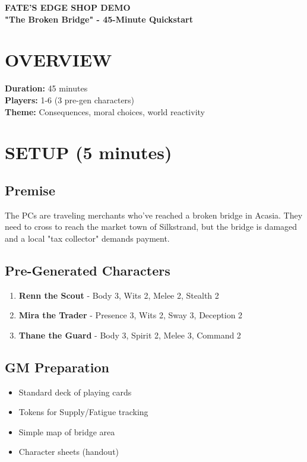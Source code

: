 \documentclass[12pt]{article}
\begin{document}
\begin{center}
{\LARGE \textbf{FATE'S EDGE SHOP DEMO}} \\
{\large \textbf{"The Broken Bridge" - 45-Minute Quickstart}}
\end{center}

\section*{OVERVIEW}

\textbf{Duration:} 45 minutes \\
\textbf{Players:} 1-6 (3 pre-gen characters) \\
\textbf{Theme:} Consequences, moral choices, world reactivity

\section{SETUP (5 minutes)}

\subsection*{Premise}
The PCs are traveling merchants who've reached a broken bridge in Acasia. They need to cross to reach the market town of Silkstrand, but the bridge is damaged and a local "tax collector" demands payment.

\subsection*{Pre-Generated Characters}
\begin{enumerate}
\item \textbf{Renn the Scout} - Body 3, Wits 2, Melee 2, Stealth 2
\item \textbf{Mira the Trader} - Presence 3, Wits 2, Sway 3, Deception 2  
\item \textbf{Thane the Guard} - Body 3, Spirit 2, Melee 3, Command 2
\end{enumerate}

\subsection*{GM Preparation}
\begin{itemize}
\item Standard deck of playing cards
\item Tokens for Supply/Fatigue tracking
\item Simple map of bridge area
\item Character sheets (handout)
\end{itemize}
\end{document}
